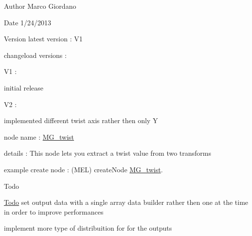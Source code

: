 \begin{DoxyAuthor}{Author}
Marco Giordano 
\end{DoxyAuthor}
\begin{DoxyDate}{Date}
1/24/2013 
\end{DoxyDate}
\begin{DoxyVersion}{Version}
latest version \-: V1 

changeload versions \-: \par
 V1 \-: \par

\begin{DoxyItemize}
\item initial release \par
 V2 \-: \par

\item implemented different twist axis rather then only Y \par
 node name \-: \hyperlink{class_m_g__twist}{M\-G\-\_\-twist}
\end{DoxyItemize}
\end{DoxyVersion}
details \-: This node lets you extract a twist value from two transforms

example create node \-: (M\-E\-L) create\-Node \hyperlink{class_m_g__twist}{M\-G\-\_\-twist}.

\begin{DoxyRefDesc}{Todo}
\item[\hyperlink{todo__todo000010}{Todo}]set output data with a single array data builder rather then one at the time in order to improve performances 

implement more type of distribuition for for the outputs\end{DoxyRefDesc}


